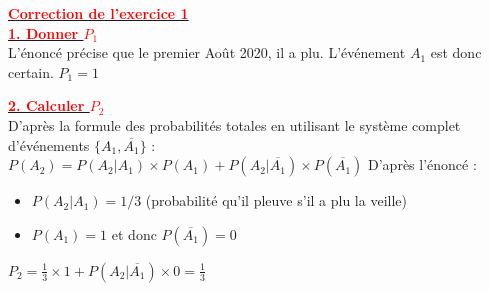\documentclass[12pt,a4paper]{article}
\begin{document}
\renewcommand{\arraystretch}{1.5}
\renewcommand{\arrayrulewidth}{1.2pt}
\vspace{3cm}

\underline{\textbf{\textcolor{red}{Correction de l'exercice 1}}}\\

\setlength{\columnseprule}{0.1mm} %
\underline{\textbf{\textcolor{red}{1. Donner $P_1$}}}\\
L'énoncé précise que le premier Août 2020, il a plu. L'événement $A_1$ est donc certain.
$ P_1 = 1 $

\underline{\textbf{\textcolor{red}{2. Calculer $P_2$}}}\\
D'après la formule des probabilités totales en utilisant le système complet d'événements $\{A_1, \overline{A_1}\}$ :
$ P(A_2) = P(A_2 | A_1) \times P(A_1) + P(A_2 | \overline{A_1}) \times P(\overline{A_1}) $
D'après l'énoncé :
\begin{itemize}
    \item $P(A_2 | A_1) = 1/3$ (probabilité qu'il pleuve s'il a plu la veille)
    \item $P(A_1) = 1$ et donc $P(\overline{A_1}) = 0$
\end{itemize}
$ P_2 = \frac{1}{3} \times 1 + P(A_2 | \overline{A_1}) \times 0 = \frac{1}{3} $
\end{document}
